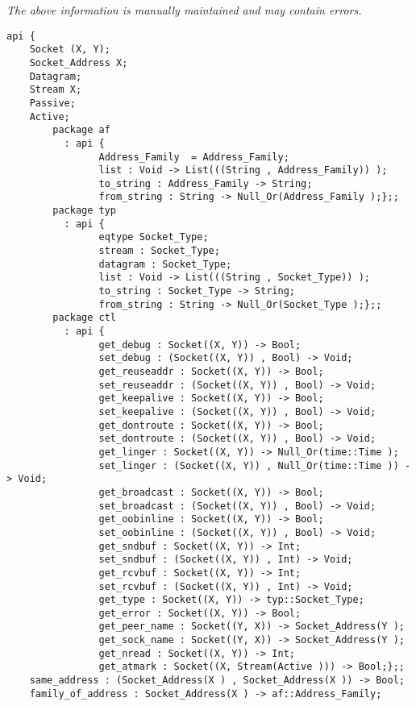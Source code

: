 \label{api:Socket\_\_Premicrothread}

{\tiny \it The above information is manually maintained and may contain errors.}
\begin{verbatim}
api {
    Socket (X, Y);
    Socket_Address X;
    Datagram;
    Stream X;
    Passive;
    Active;
        package af
          : api {
                Address_Family  = Address_Family;
                list : Void -> List(((String , Address_Family)) );
                to_string : Address_Family -> String;
                from_string : String -> Null_Or(Address_Family );};;
        package typ
          : api {
                eqtype Socket_Type;
                stream : Socket_Type;
                datagram : Socket_Type;
                list : Void -> List(((String , Socket_Type)) );
                to_string : Socket_Type -> String;
                from_string : String -> Null_Or(Socket_Type );};;
        package ctl
          : api {
                get_debug : Socket((X, Y)) -> Bool;
                set_debug : (Socket((X, Y)) , Bool) -> Void;
                get_reuseaddr : Socket((X, Y)) -> Bool;
                set_reuseaddr : (Socket((X, Y)) , Bool) -> Void;
                get_keepalive : Socket((X, Y)) -> Bool;
                set_keepalive : (Socket((X, Y)) , Bool) -> Void;
                get_dontroute : Socket((X, Y)) -> Bool;
                set_dontroute : (Socket((X, Y)) , Bool) -> Void;
                get_linger : Socket((X, Y)) -> Null_Or(time::Time );
                set_linger : (Socket((X, Y)) , Null_Or(time::Time )) -> Void;
                get_broadcast : Socket((X, Y)) -> Bool;
                set_broadcast : (Socket((X, Y)) , Bool) -> Void;
                get_oobinline : Socket((X, Y)) -> Bool;
                set_oobinline : (Socket((X, Y)) , Bool) -> Void;
                get_sndbuf : Socket((X, Y)) -> Int;
                set_sndbuf : (Socket((X, Y)) , Int) -> Void;
                get_rcvbuf : Socket((X, Y)) -> Int;
                set_rcvbuf : (Socket((X, Y)) , Int) -> Void;
                get_type : Socket((X, Y)) -> typ::Socket_Type;
                get_error : Socket((X, Y)) -> Bool;
                get_peer_name : Socket((Y, X)) -> Socket_Address(Y );
                get_sock_name : Socket((Y, X)) -> Socket_Address(Y );
                get_nread : Socket((X, Y)) -> Int;
                get_atmark : Socket((X, Stream(Active ))) -> Bool;};;
    same_address : (Socket_Address(X ) , Socket_Address(X )) -> Bool;
    family_of_address : Socket_Address(X ) -> af::Address_Family;

\end{verbatim}
